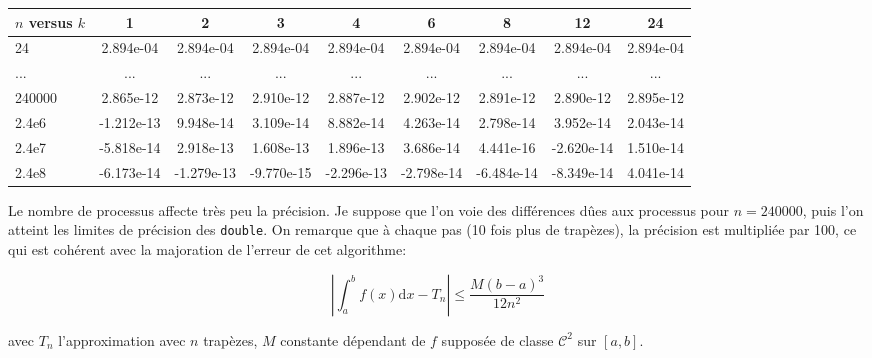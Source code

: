 \documentclass{article}
\begin{document}
\begin{table}[h]
\small
\centering
\begin{tabular}{|l|c|c|c|c|c|c|c|c|}
  \hline
  $n$ versus $k$ & 1 & 2 & 3 & 4 & 6 & 8 & 12 & 24 \\ \hline
  24 & 2.894e-04 & 2.894e-04 &2.894e-04 &2.894e-04 &2.894e-04 &2.894e-04 & 2.894e-04 &2.894e-04 \\ \hline
  ... & ... & ... & ... & ... & ... & ... & ... & ...  \\ \hline
  240000 & 2.865e-12 & 2.873e-12 & 2.910e-12 & 2.887e-12 & 2.902e-12 & 2.891e-12 & 2.890e-12 & 2.895e-12 \\ \hline
  2.4e6 & -1.212e-13 & 9.948e-14 & 3.109e-14 & 8.882e-14 & 4.263e-14 & 2.798e-14 & 3.952e-14 & 2.043e-14 \\ \hline
  2.4e7 &-5.818e-14 & 2.918e-13 & 1.608e-13 & 1.896e-13 & 3.686e-14 & 4.441e-16 & -2.620e-14 & 1.510e-14 \\ \hline
  2.4e8 & -6.173e-14 & -1.279e-13 & -9.770e-15 & -2.296e-13 & -2.798e-14 & -6.484e-14 &-8.349e-14& 4.041e-14 \\
  \hline
\end{tabular}
\end{table}



Le nombre de processus affecte très peu la précision. Je suppose que l'on voie des différences dûes aux processus pour $n=240000$, puis l'on atteint les limites de précision des \lstinline[style=ccode]|double|. On remarque que à chaque pas (10 fois plus de trapèzes), la précision est multipliée par 100, ce qui est cohérent avec la majoration de l'erreur de cet algorithme:

$$
\left|\int_{a}^{b}f(x)\mathrm{d}x -T_n \right| \leq \frac{M(b-a)^3}{12n^2}
$$

avec $T_n$ l'approximation avec $n$ trapèzes, $M$ constante dépendant de $f$ supposée de classe $\mathcal{C}^2$ sur $[a,b]$.
\end{document}
